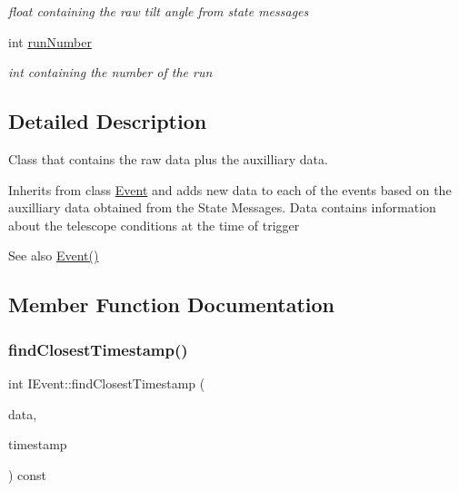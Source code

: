 \begin{DoxyCompactItemize}
\begin{DoxyCompactList}\small\item\em float containing the raw tilt angle from state messages \end{DoxyCompactList}\item 
\mbox{\label{classIEvent_a976b0ef3331ef124d3b13e988e91a026}} 
int \hyperlink{classIEvent_a976b0ef3331ef124d3b13e988e91a026}{run\+Number}
\begin{DoxyCompactList}\small\item\em int containing the number of the run \end{DoxyCompactList}\end{DoxyCompactItemize}


\subsection{Detailed Description}
Class that contains the raw data plus the auxilliary data. 

Inherits from class \hyperlink{classEvent}{Event} and adds new data to each of the events based on the auxilliary data obtained from the State Messages. Data contains information about the telescope conditions at the time of trigger \begin{DoxySeeAlso}{See also}
\hyperlink{classEvent_a5a40dd4708297f7031e29b39e039ae10}{Event()} 
\end{DoxySeeAlso}


\subsection{Member Function Documentation}
\mbox{\label{classIEvent_a9fe52c0b0da4a3768c37b3b4a8c19101}} 
\subsubsection{\texorpdfstring{find\+Closest\+Timestamp()}{findClosestTimestamp()}}
{\footnotesize\ttfamily int I\+Event\+::find\+Closest\+Timestamp (\begin{DoxyParamCaption}\item[{const std\+::vector$<$ std\+::vector$<$ std\+::string $>$$>$ \&}]{data,  }\item[{int}]{timestamp }\end{DoxyParamCaption}) const\hspace{0.3cm}{\ttfamily [private]}}



